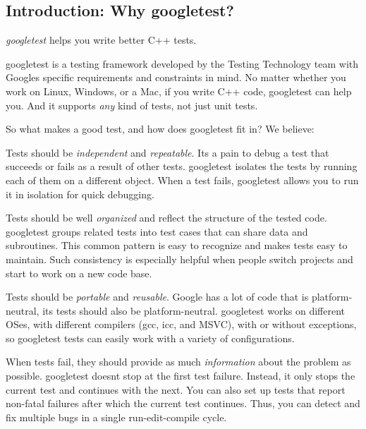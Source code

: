 \subsection*{Introduction\+: Why googletest?}

{\itshape googletest} helps you write better C++ tests.

googletest is a testing framework developed by the Testing Technology team with Google\textquotesingle{}s specific requirements and constraints in mind. No matter whether you work on Linux, Windows, or a Mac, if you write C++ code, googletest can help you. And it supports {\itshape any} kind of tests, not just unit tests.

So what makes a good test, and how does googletest fit in? We believe\+:


\begin{DoxyEnumerate}
\item Tests should be {\itshape independent} and {\itshape repeatable}. It\textquotesingle{}s a pain to debug a test that succeeds or fails as a result of other tests. googletest isolates the tests by running each of them on a different object. When a test fails, googletest allows you to run it in isolation for quick debugging.
\end{DoxyEnumerate}
\begin{DoxyEnumerate}
\item Tests should be well {\itshape organized} and reflect the structure of the tested code. googletest groups related tests into test cases that can share data and subroutines. This common pattern is easy to recognize and makes tests easy to maintain. Such consistency is especially helpful when people switch projects and start to work on a new code base.
\end{DoxyEnumerate}
\begin{DoxyEnumerate}
\item Tests should be {\itshape portable} and {\itshape reusable}. Google has a lot of code that is platform-\/neutral, its tests should also be platform-\/neutral. googletest works on different O\+Ses, with different compilers (gcc, icc, and M\+S\+VC), with or without exceptions, so googletest tests can easily work with a variety of configurations.
\end{DoxyEnumerate}
\begin{DoxyEnumerate}
\item When tests fail, they should provide as much {\itshape information} about the problem as possible. googletest doesn\textquotesingle{}t stop at the first test failure. Instead, it only stops the current test and continues with the next. You can also set up tests that report non-\/fatal failures after which the current test continues. Thus, you can detect and fix multiple bugs in a single run-\/edit-\/compile cycle.
\end{DoxyEnumerate}
